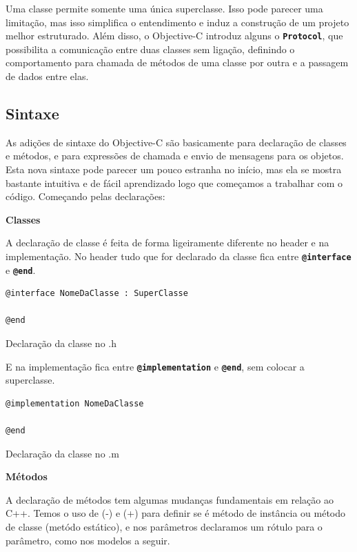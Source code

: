 \documentclass[a4paper,12pt,brazil,doubleside]{book}
\begin{document}
\begin{singlespace}
Uma classe permite  somente uma única superclasse. Isso pode parecer uma limitação, mas isso simplifica o entendimento e induz a construção de um projeto melhor estruturado. Além disso, o Objective-C introduz alguns o \texttt{\textbf{Protocol}}, que possibilita a comunicação entre duas classes sem ligação, definindo o comportamento para chamada de métodos de uma classe por outra e a passagem de dados entre elas.


\subsection{Sintaxe}


As adições de sintaxe do Objective-C são basicamente para declaração de classes e métodos, e para expressões de chamada e envio de mensagens para os objetos. Esta nova sintaxe pode parecer um pouco estranha no início, mas ela se mostra bastante intuitiva e de fácil aprendizado logo que começamos a trabalhar com o código.
Começando pelas declarações:





\textbf{Classes}


A declaração de classe é feita de forma ligeiramente diferente no header e na implementação. No header tudo que for declarado da classe fica entre \texttt{\textbf{@interface}} e \texttt{\textbf{@end}}.

\begin{listing}
\begin{verbatim}
@interface NomeDaClasse : SuperClasse

@end
\end{verbatim}
\caption{Declaração da classe no .h}
\end{listing}


E na implementação fica entre \texttt{\textbf{@implementation}} e \texttt{\textbf{@end}}, sem colocar a superclasse.

\begin{listing}
\begin{verbatim}
@implementation NomeDaClasse

@end
\end{verbatim}
\caption{Declaração da classe no .m}
\end{listing}


\textbf{Métodos}


A declaração de métodos tem algumas mudanças fundamentais em relação ao C++. Temos o uso de (-) e (+) para definir se é método de instância ou método de classe (metódo estático), e nos parâmetros declaramos um rótulo para o parâmetro, como nos modelos a seguir.



\end{singlespace}
\end{document}
